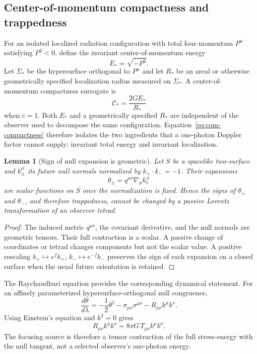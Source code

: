 \documentclass[11pt]{article}
\newtheorem{lemma}{Lemma}
\theoremstyle{remark}
\begin{document}
\subsection{Center-of-momentum compactness and trappedness}
For an isolated localized radiation configuration with total four-momentum $P^\mu$ satisfying $P^2<0$, define the invariant center-of-momentum energy
\begin{equation}
 E_* = \sqrt{-P^2}.
\end{equation}
Let $\Sigma_*$ be the hypersurface orthogonal to $P^\mu$ and let $R_*$ be an areal or otherwise geometrically specified localization radius measured on $\Sigma_*$. A center-of-momentum compactness surrogate is
\begin{equation}
 \mathcal C_* = \frac{2GE_*}{R_*}
 \label{eq:com-compactness}
\end{equation}
when $c=1$. Both $E_*$ and a geometrically specified $R_*$ are independent of the observer used to decompose the same configuration. Equation~\eqref{eq:com-compactness} therefore isolates the two ingredients that a one-photon Doppler factor cannot supply: invariant total energy and invariant localization.

\begin{lemma}[Sign of null expansion is geometric]
Let $S$ be a spacelike two-surface and $k_\pm^\mu$ its future null normals normalized by $k_+\cdot k_-=-1$. Their expansions
\begin{equation}
 \theta_\pm=q^{\mu\nu}\nabla_\mu k^\pm_\nu
\end{equation}
are scalar functions on $S$ once the normalization is fixed. Hence the signs of $\theta_+$ and $\theta_-$, and therefore trappedness, cannot be changed by a passive Lorentz transformation of an observer tetrad.
\end{lemma}

\begin{proof}
The induced metric $q^{\mu\nu}$, the covariant derivative, and the null normals are geometric tensors. Their full contraction is a scalar. A passive change of coordinates or tetrad changes components but not the scalar value. A positive rescaling $k_+\mapsto e^f k_+$, $k_-\mapsto e^{-f}k_-$ preserves the sign of each expansion on a closed surface when the usual future orientation is retained.
\end{proof}

The Raychaudhuri equation provides the corresponding dynamical statement. For an affinely parameterized hypersurface-orthogonal null congruence,
\begin{equation}
 \frac{d\theta}{d\lambda}
 =-\frac12\theta^2-\sigma_{\mu\nu}\sigma^{\mu\nu}-R_{\mu\nu}k^\mu k^\nu.
 \label{eq:raychaudhuri-photon}
\end{equation}
Using Einstein's equation and $k^2=0$ gives
\begin{equation}
 R_{\mu\nu}k^\mu k^\nu
 =8\pi G\,T_{\mu\nu}k^\mu k^\nu.
\end{equation}
The focusing source is therefore a tensor contraction of the full stress-energy with the null tangent, not a selected observer's one-photon energy.
\end{document}
